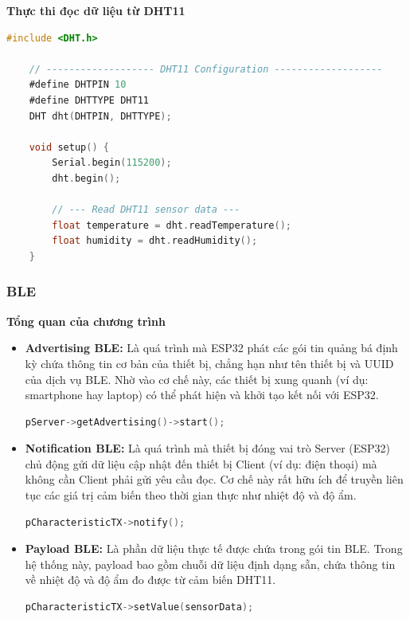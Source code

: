 \noindent\textbf{Thực thi đọc dữ liệu từ DHT11}

\begin{lstlisting}[style=StyleCode, language=C, caption={Thực thi đọc dữ liệu từ sensor DHT11.}]
	#include <DHT.h>
	
	// ------------------- DHT11 Configuration -------------------
	#define DHTPIN 10
	#define DHTTYPE DHT11
	DHT dht(DHTPIN, DHTTYPE);
	
	void setup() {
		Serial.begin(115200);
		dht.begin();
		
		// --- Read DHT11 sensor data ---
		float temperature = dht.readTemperature();
		float humidity = dht.readHumidity();
	}
\end{lstlisting}

\subsubsection{BLE}

\noindent\textbf{Tổng quan của chương trình}

%

\begin{itemize}[label=-]
	\item \textbf{Advertising BLE:}
	Là quá trình mà ESP32 phát các gói tin quảng bá định kỳ chứa thông tin cơ bản của thiết bị, chẳng hạn như tên thiết bị và UUID của dịch vụ BLE.
	Nhờ vào cơ chế này, các thiết bị xung quanh (ví dụ: smartphone hay laptop) có thể phát hiện và khởi tạo kết nối với ESP32.
	\begin{lstlisting}[style=StyleCode, language=C]
		pServer->getAdvertising()->start();
	\end{lstlisting}
	
	\item \textbf{Notification BLE:}  
	Là quá trình mà thiết bị đóng vai trò Server (ESP32) chủ động gửi dữ liệu cập nhật đến thiết bị Client (ví dụ: điện thoại) mà không cần Client phải gửi yêu cầu đọc.  
	Cơ chế này rất hữu ích để truyền liên tục các giá trị cảm biến theo thời gian thực như nhiệt độ và độ ẩm.  
	\begin{lstlisting}[style=StyleCode, language=C]
		pCharacteristicTX->notify();
	\end{lstlisting}
	
	\item \textbf{Payload BLE:}  
	Là phần dữ liệu thực tế được chứa trong gói tin BLE.  
	Trong hệ thống này, payload bao gồm chuỗi dữ liệu định dạng sẵn, chứa thông tin về nhiệt độ và độ ẩm đo được từ cảm biến DHT11.  
	\begin{lstlisting}[style=StyleCode, language=C]
		pCharacteristicTX->setValue(sensorData);
	\end{lstlisting}
	
\end{itemize}


